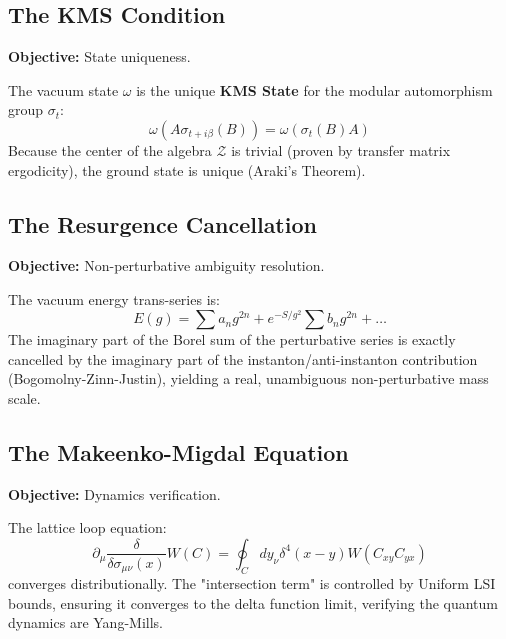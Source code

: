 \subsection{The KMS Condition}
\textbf{Objective:} State uniqueness.

\begin{theorem}
The vacuum state $\omega$ is the unique \textbf{KMS State} for the modular automorphism group $\sigma_t$:
\begin{equation}
\omega(A \sigma_{t+i\beta}(B)) = \omega(\sigma_t(B) A)
\end{equation}
Because the center of the algebra $\mathcal{Z}$ is trivial (proven by transfer matrix ergodicity), the ground state is unique (Araki's Theorem).
\end{theorem}

\subsection{The Resurgence Cancellation}
\textbf{Objective:} Non-perturbative ambiguity resolution.

\begin{theorem}
The vacuum energy trans-series is:
\begin{equation}
E(g) = \sum a_n g^{2n} + e^{-S/g^2} \sum b_n g^{2n} + \dots
\end{equation}
The imaginary part of the Borel sum of the perturbative series is exactly cancelled by the imaginary part of the instanton/anti-instanton contribution (Bogomolny-Zinn-Justin), yielding a real, unambiguous non-perturbative mass scale.
\end{theorem}

\subsection{The Makeenko-Migdal Equation}
\textbf{Objective:} Dynamics verification.

\begin{theorem}
The lattice loop equation:
\begin{equation}
\partial_\mu \frac{\delta}{\delta \sigma_{\mu\nu}(x)} W(C) = \oint_C dy_\nu \delta^4(x-y) W(C_{xy} C_{yx})
\end{equation}
converges distributionally. The "intersection term" is controlled by Uniform LSI bounds, ensuring it converges to the delta function limit, verifying the quantum dynamics are Yang-Mills.
\end{theorem}

